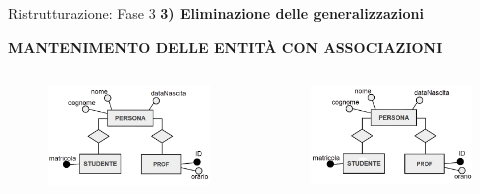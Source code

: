 \begin{frame}{Ristrutturazione: Fase 3}
\textbf{3) Eliminazione delle generalizzazioni}
\\\vspace{2em}
\begin{center}
    \textbf{MANTENIMENTO DELLE ENTIT\`A CON ASSOCIAZIONI}
\end{center}
\begin{columns}
        \begin{column}{0.5\textwidth}
            \begin{figure}[h]
        \centering
        \includegraphics[width=1\textwidth]{img/i6.png}
    \end{figure}
        \end{column}
        \begin{column}{0.5\textwidth}
            \begin{figure}[h]
        \centering
        \includegraphics[width=1\textwidth]{img/i7.png}
    \end{figure}
        \end{column}
    \end{columns}
\end{frame} 
